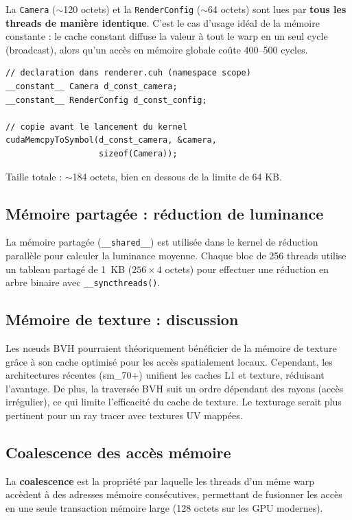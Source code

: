 \documentclass[12pt,a4paper]{article}
\begin{document}
La \texttt{Camera} ($\sim$120 octets) et la \texttt{RenderConfig} ($\sim$64 octets) sont
lues par \textbf{tous les threads de manière identique}. C'est le cas d'usage idéal
de la mémoire constante : le cache constant diffuse la valeur à tout le warp
en un seul cycle (broadcast), alors qu'un accès en mémoire globale coûte 400--500 cycles.

\begin{lstlisting}[caption={Déclaration et utilisation de la mémoire constante}]
// declaration dans renderer.cuh (namespace scope)
__constant__ Camera d_const_camera;
__constant__ RenderConfig d_const_config;

// copie avant le lancement du kernel
cudaMemcpyToSymbol(d_const_camera, &camera,
                   sizeof(Camera));
\end{lstlisting}

Taille totale : $\sim$184 octets, bien en dessous de la limite de 64 KB.

\subsection{Mémoire partagée : réduction de luminance}

La mémoire partagée (\texttt{\_\_shared\_\_}) est utilisée dans le kernel de réduction
parallèle pour calculer la luminance moyenne. Chaque bloc de 256 threads utilise
un tableau partagé de 1~KB ($256 \times 4$ octets) pour effectuer une réduction
en arbre binaire avec \texttt{\_\_syncthreads()}.

\subsection{Mémoire de texture : discussion}

Les nœuds BVH pourraient théoriquement bénéficier de la mémoire de texture
grâce à son cache optimisé pour les accès spatialement locaux. Cependant,
les architectures récentes (sm\_70+) unifient les caches L1 et texture,
réduisant l'avantage. De plus, la traversée BVH suit un ordre dépendant
des rayons (accès irrégulier), ce qui limite l'efficacité du cache de texture.
Le texturage serait plus pertinent pour un ray tracer avec textures UV mappées.

\subsection{Coalescence des accès mémoire}

La \textbf{coalescence} est la propriété par laquelle les threads d'un même warp accèdent
à des adresses mémoire consécutives, permettant de fusionner les accès en une seule
transaction mémoire large (128 octets sur les GPU modernes).
\end{document}
